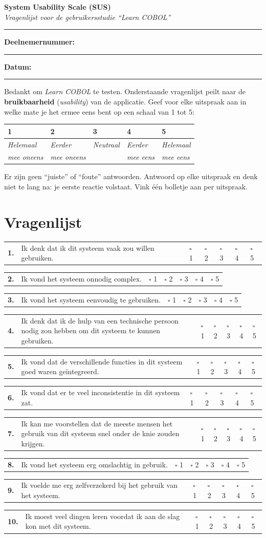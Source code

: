 \documentclass[11pt,a4paper]{article}
\makeatletter
\newcommand{\likertrow}[2]{%
    \begin{tabularx}{\textwidth}{@{}p{0.7cm} X *{5}{>{\centering\arraybackslash}p{1.1cm}}@{}}
    \textbf{#1.} & #2 & $\square$ 1 & $\square$ 2 & $\square$ 3 & $\square$ 4 & $\square$ 5 \\
    \end{tabularx}\par\medskip%
}
\makeatother
\begin{document}
\begin{center}
{\LARGE\bfseries System Usability Scale (SUS)}\\[0.3cm]
{\large \textit{Vragenlijst voor de gebruikersstudie ``Learn COBOL''}}\\[0.6cm]
\rule{0.6\textwidth}{0.4pt}
\end{center}

\bigskip

\noindent\textbf{Deelnemernummer:}\ \rule{3cm}{0.4pt}\hfill\textbf{Datum:}\ \rule{3cm}{0.4pt}

\bigskip

\noindent
Bedankt om \textit{Learn COBOL} te testen. Onderstaande vragenlijst peilt naar de \textbf{bruikbaarheid} (\textit{usability}) van de applicatie. 
Geef voor elke uitspraak aan in welke mate je het ermee eens bent op een schaal van 1 tot 5:

\begin{center}
\begin{tabularx}{0.85\textwidth}{X X X X X}
\textbf{1} & \textbf{2} & \textbf{3} & \textbf{4} & \textbf{5} \\
\hline
\textit{Helemaal} & \textit{Eerder} & \textit{Neutraal} & \textit{Eerder} & \textit{Helemaal} \\
\textit{mee oneens} & \textit{mee oneens} & & \textit{mee eens} & \textit{mee eens} \\
\end{tabularx}
\end{center}

\bigskip

\noindent
Er zijn geen ``juiste'' of ``foute'' antwoorden. Antwoord op elke uitspraak en denk niet te lang na: je eerste reactie volstaat. Vink één bolletje aan per uitspraak.

\section*{Vragenlijst}

\likertrow{1}{Ik denk dat ik dit systeem vaak zou willen gebruiken.}
\likertrow{2}{Ik vond het systeem onnodig complex.}
\likertrow{3}{Ik vond het systeem eenvoudig te gebruiken.}
\likertrow{4}{Ik denk dat ik de hulp van een technische persoon nodig zou hebben om dit systeem te kunnen gebruiken.}
\likertrow{5}{Ik vond dat de verschillende functies in dit systeem goed waren geïntegreerd.}
\likertrow{6}{Ik vond dat er te veel inconsistentie in dit systeem zat.}
\likertrow{7}{Ik kan me voorstellen dat de meeste mensen het gebruik van dit systeem snel onder de knie zouden krijgen.}
\likertrow{8}{Ik vond het systeem erg omslachtig in gebruik.}
\likertrow{9}{Ik voelde me erg zelfverzekerd bij het gebruik van het systeem.}
\likertrow{10}{Ik moest veel dingen leren voordat ik aan de slag kon met dit systeem.}
\end{document}
